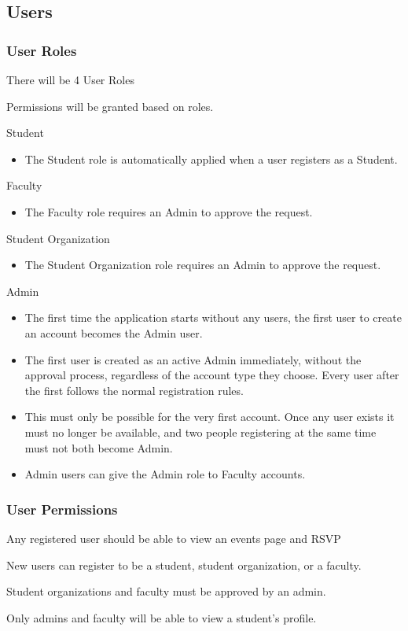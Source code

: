\subsection{Users}
	\subsubsection{User Roles}
		\begin{subenumerate}[leftmargin=3\parindent]
			\item There will be 4 User Roles
			\item Permissions will be granted based on roles.
			\item Student
				\begin{itemize}
					\item The Student role is automatically applied when a user registers as a Student.
				\end{itemize}
			\item Faculty
				\begin{itemize}
					\item The Faculty role requires an Admin to approve the request.
				\end{itemize}
			\item Student Organization
				\begin{itemize}
					\item The Student Organization role requires an Admin to approve the request.
				\end{itemize}
			\item Admin
				\begin{itemize}
					\item The first time the application starts without any users, the first user to create an account becomes the Admin user.
					\item The first user is created as an active Admin immediately, without the approval process, regardless of the account type they choose. Every user after the first follows the normal registration rules.
					\item This must only be possible for the very first account. Once any user exists it must no longer be available, and two people registering at the same time must not both become Admin.
					\item Admin users can give the Admin role to Faculty accounts.
				\end{itemize}
		\end{subenumerate}

	\subsubsection{User Permissions}
		\begin{subenumerate}[leftmargin=3\parindent]
			\item Any registered user should be able to view an events page and RSVP
			\item New users can register to be a student, student organization, or a faculty.
			\item Student organizations and faculty must be approved by an admin.
			\item Only admins and faculty will be able to view a student’s profile.
		\end{subenumerate}
